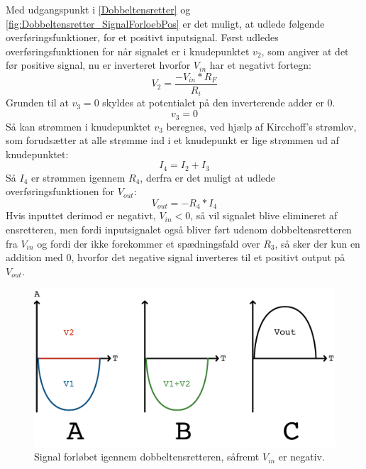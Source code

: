 % 
Med udgangspunkt i \autoref{Dobbeltensretter} og \autoref{fig:Dobbeltensretter_SignalForloebPos} er det muligt, at udlede følgende overføringsfunktioner, for et positivt inputsignal. Først udledes overføringsfunktionen for når signalet er i knudepunktet $v_2$, som angiver at det før positive signal, nu er inverteret hvorfor $V_{in}$ har et negativt fortegn: 
%
\begin{equation}
	V_2 = \frac{-V_{in}*R_F}{R_i}
\end{equation}
%
Grunden til at $v_3 = 0$ skyldes at potentialet på den inverterende adder er 0.
%
\begin{equation}
	v_3 = 0
\end{equation}
%
 Så kan strømmen i knudepunktet $v_3$ beregnes, ved hjælp af Kircchoff's strømlov, som forudsætter at alle strømme ind i et knudepunkt er lige strømmen ud af knudepunktet: 
%
\begin{equation}
	I_4 = I_2+I_3
\end{equation}
%
Så $I_4$ er strømmen igennem $R_4$, derfra er det muligt at udlede overføringsfunktionen for $V_{out}$:
%
\begin{equation}
	V_{out} = -R_4*I_4
\end{equation}
%
Hvis inputtet derimod er negativt, $V_{in} < 0$, så vil signalet blive elimineret af ensretteren, men fordi inputsignalet også bliver ført udenom dobbeltensretteren fra $V_{in}$ og fordi der ikke forekommer et spædningsfald over $R_3$, så sker der kun en addition med 0, hvorfor det negative signal inverteres til et positivt output på $V_{out}$. 
%
\begin{figure}[H]
	\centering
	\includegraphics[resolution=300,scale=\circuitSize]{Figure/Circuits/Dobbeltensretter_SignalForloeb_Negative.pdf}
	\caption{Signal forløbet igennem dobbeltensretteren, såfremt $V_{in}$ er negativ.}
	\label{fig:Dobbeltensretter_SignalForloebNeg}
\end{figure}
